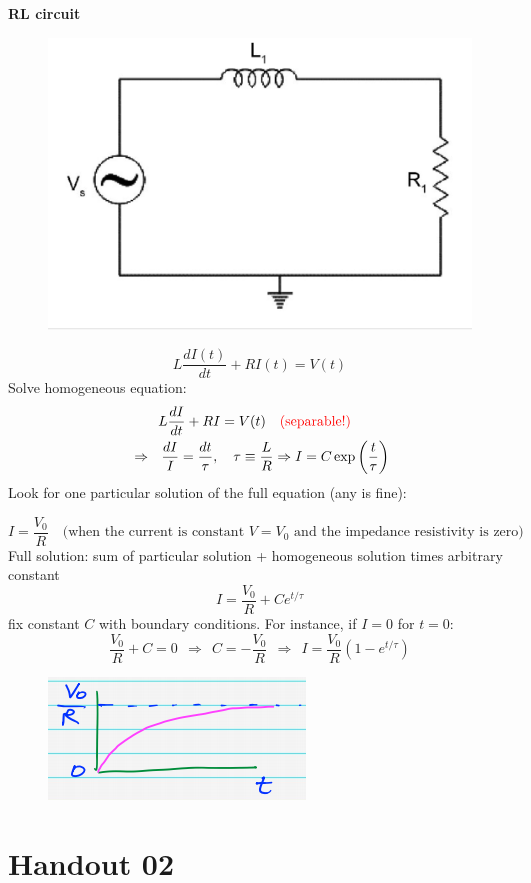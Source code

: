 \documentclass{article}
\begin{document}
\vspace{2mm}\noindent
\textbf{RL circuit}

\begin{figure}[h]
    \centering
    \includegraphics[width=0.3\linewidth]{fig2.png}
\end{figure}
\begin{equation}
    L \frac{dI(t)}{dt} + R I(t) = V(t)
\end{equation}
Solve homogeneous equation:
\begin{align*}
    & \quad \quad L\frac{dI}{dt} + RI = V(t) \quad \color{red}{(\text{separable!)}}\\
    &\Rightarrow \ \ \frac{dI}{I} = \frac{dt}{\tau}, \quad \tau \equiv \frac{L}{R} \Rightarrow I = C \exp\left( \frac{t}{\tau} \right)
\end{align*}
Look for one particular solution of the full equation (any is fine):

\newpage
\begin{equation}
    I= \frac{V_0}{R} \quad \text{(when the current is constant $V=V_0$  and the impedance resistivity is zero)}
\end{equation}
Full solution: sum of particular solution + homogeneous solution times arbitrary constant
\begin{equation}
    I = \frac{V_0}{R} + Ce^{t/\tau}
\end{equation}
fix constant $C$ with boundary conditions. For instance, if $I=0$ for $t=0$:
\begin{equation}
    \frac{V_0}{R} + C = 0 \ \  \Rightarrow \ \  C = -\frac{V_0}{R} \ \ \Rightarrow \ \  I = \frac{V_0}{R} ( 1 - e^{t/\tau} )
\end{equation}
\begin{figure}[h]
    \centering
    \includegraphics[width=0.3\linewidth]{fig3.png}
\end{figure}

\section{Handout 02}
\end{document}
